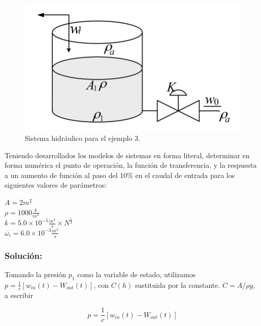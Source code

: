 \documentclass[a4paper,12pt,twoside]{proyectotanquesecci}
\begin{document}
\begin{figure}[h]
\centering
\includegraphics[scale=0.6]{Figura9}
\renewcommand{\figurename}{Fig.}
\caption{Sistema hidráulico para el ejemplo 3.}
\label{Sistema hidráulico para el ejemplo 3.}
\end{figure}

Teniendo desarrollados los modelos de sistemas en forma literal, determinar en forma numérica el punto de operación, la función de transferencia, y la respuesta a un aumento de función al paso del 10\% en el caudal de entrada para los siguientes valores de parámetros:

\begin{center}
$A=2m^{2}$ \\
$\rho=1000\frac {k}{m^{3}}$ \\
$k=5.0\times 10^{-5}\frac {m^{4}}{s}\times N^{\frac {1}{2}}$ \\
$\overline{\omega _{i}}=6.0\times 10^{-3}\frac {m^{3}}{s}$ \\
\end{center}

\subsubsection{Solución:}

Tomando la presión $p_{1}$ como la variable de estado, utilizamos $p=\frac {1}{c}\left[ w_{in}\left( t\right) -W_{out}\left( t\right) \right]$, con $C\left(h\right)$ sustituida por la constante. $C=A/\rho g$, a escribir

\begin{equation}
p=\frac {1}{c}\left[ w_{in}\left( t\right) -W_{out}\left( t\right) \right]
\end{equation}
\end{document}

